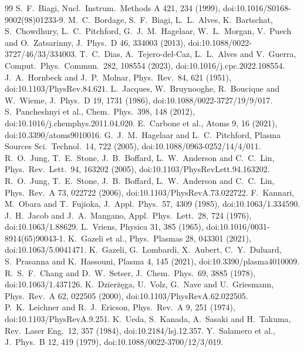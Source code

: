 \documentclass[11pt]{article}
\begin{document}
\begin{thebibliography}{99}
\footnotesize
\setlength{\itemsep}{1pt}
 S.~F.~Biagi, Nucl.\ Instrum.\ Methods A 421, 234 (1999), doi:10.1016/S0168-9002(98)01233-9.
 M.~C.~Bordage, S.~F.~Biagi, L.~L.~Alves, K.~Bartschat, S.~Chowdhury, L.~C.~Pitchford, G.~J.~M.~Hagelaar, W.~L.~Morgan, V.~Puech and O.~Zatsarinny, J.\ Phys.\ D 46, 334003 (2013), doi:10.1088/0022-3727/46/33/334003.
 T.~C.~Dias, A.~Tejero-del-Caz, L.~L.~Alves and V.~Guerra, Comput.\ Phys.\ Commun.\ 282, 108554 (2023), doi:10.1016/j.cpc.2022.108554.
 J.~A.~Hornbeck and J.~P.~Molnar, Phys.\ Rev.\ 84, 621 (1951), doi:10.1103/PhysRev.84.621.
 L.~Jacques, W.~Bruynooghe, R.~Boucique and W.~Wieme, J.\ Phys.\ D 19, 1731 (1986), doi:10.1088/0022-3727/19/9/017.
 S.~Pancheshnyi et al., Chem.\ Phys.\ 398, 148 (2012), doi:10.1016/j.chemphys.2011.04.020.
 E.~Carbone et al., Atoms 9, 16 (2021), doi:10.3390/atoms9010016.
 G.~J.~M.~Hagelaar and L.~C.~Pitchford, Plasma Sources Sci.\ Technol.\ 14, 722 (2005), doi:10.1088/0963-0252/14/4/011.
 R.~O.~Jung, T.~E.~Stone, J.~B.~Boffard, L.~W.~Anderson and C.~C.~Lin, Phys.\ Rev.\ Lett.\ 94, 163202 (2005), doi:10.1103/PhysRevLett.94.163202.
 R.~O.~Jung, T.~E.~Stone, J.~B.~Boffard, L.~W.~Anderson and C.~C.~Lin, Phys.\ Rev.\ A 73, 022722 (2006), doi:10.1103/PhysRevA.73.022722.
 F.~Kannari, M.~Obara and T.~Fujioka, J.\ Appl.\ Phys.\ 57, 4309 (1985), doi:10.1063/1.334590.
 J.~H.~Jacob and J.~A.~Mangano, Appl.\ Phys.\ Lett.\ 28, 724 (1976), doi:10.1063/1.88629.
 L.~Vriens, Physica 31, 385 (1965), doi:10.1016/0031-8914(65)90043-1.
 K.~Gazeli et al., Phys.\ Plasmas 28, 043301 (2021), doi:10.1063/5.0041471.
 K.~Gazeli, G.~Lombardi, X.~Aubert, C.~Y.~Duluard, S.~Prasanna and K.~Hassouni, Plasma 4, 145 (2021), doi:10.3390/plasma4010009.
 R.~S.~F.~Chang and D.~W.~Setser, J.\ Chem.\ Phys.\ 69, 3885 (1978), doi:10.1063/1.437126.
 K.~Dzier\.z\k{e}ga, U.~Volz, G.~Nave and U.~Griesmann, Phys.\ Rev.\ A 62, 022505 (2000), doi:10.1103/PhysRevA.62.022505.
 P.~K.~Leichner and R.~J.~Ericson, Phys.\ Rev.\ A 9, 251 (1974), doi:10.1103/PhysRevA.9.251.
 K.~Ueda, S.~Kanada, A.~Sasaki and H.~Takuma, Rev.\ Laser Eng.\ 12, 357 (1984), doi:10.2184/lsj.12.357.
 Y.~Salamero et al., J.\ Phys.\ B 12, 419 (1979), doi:10.1088/0022-3700/12/3/019.

\end{thebibliography}
\end{document}

